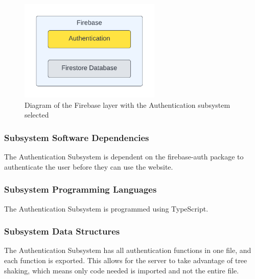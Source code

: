 \begin{figure}[h!]
	\centering
	\includegraphics[width=0.60\textwidth]{images/DDS_Diagram_Firebase_Authentication} %
	\caption{Diagram of the Firebase layer with the Authentication subsystem selected}
\end{figure}



\subsubsection{Subsystem Software Dependencies}
The Authentication Subsystem is dependent on the firebase-auth package to authenticate the user before they can use the website.

\subsubsection{Subsystem Programming Languages}
The Authentication Subsystem is programmed using TypeScript.

\subsubsection{Subsystem Data Structures}
The Authentication Subsystem has all authentication functions in one file, and each function is exported. This allows for the server to take advantage of tree shaking, which means only code needed is imported and not the entire file.


